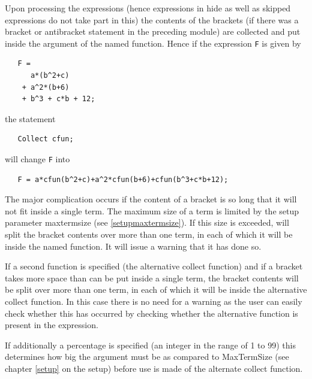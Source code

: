 \noindent Upon processing the expressions (hence expressions 
in hide as well as skipped expressions do not take part in this) the 
contents of the brackets (if there was a bracket or 
antibracket statement in the preceding module) are 
collected and put inside the argument of the named function. Hence if the 
expression \verb:F: is given by
\begin{verbatim}
   F =
      a*(b^2+c)
    + a^2*(b+6)
    + b^3 + c*b + 12;
\end{verbatim}
the statement
\begin{verbatim}
   Collect cfun;
\end{verbatim}
will change \verb:F: into
\begin{verbatim}
   F = a*cfun(b^2+c)+a^2*cfun(b+6)+cfun(b^3+c*b+12);
\end{verbatim}
The major complication occurs if the content of a 
bracket is so long that it will not fit inside a single term. The maximum 
size of a term is limited by the setup parameter 
maxtermsize (see \ref{setupmaxtermsize}). If this size 
is exceeded, {\FORM} will split the bracket contents over more than one term, 
in each of which it will be inside the named function. It will issue a 
warning that it has done so. \vspace{4mm}

\noindent If a second function is specified (the 
alternative collect function) and if a bracket takes 
more space than can be put inside a single term, the bracket contents will 
be split over more than one term, in each of which it will be inside the 
alternative collect function. In this case there is no need for a 
warning 
as the user can easily check whether this has occurred by checking whether 
the alternative function is present in the expression. \vspace{4mm}

\noindent If additionally a percentage is specified (an 
integer in the range of 1 to 99) this determines how big the argument must 
be as compared to MaxTermSize (see chapter \ref{setup} on the setup) before 
use is made of the alternate collect function. \vspace{10mm}

 
